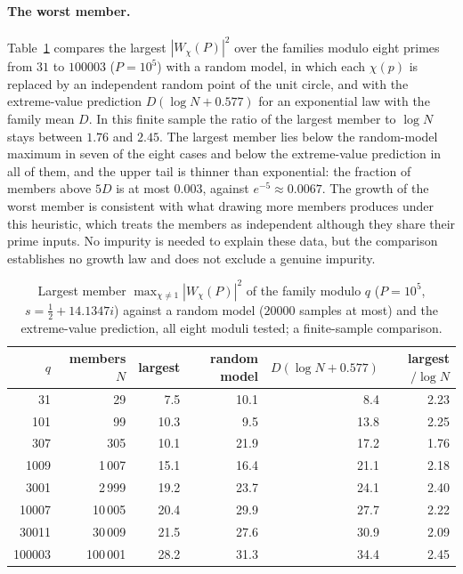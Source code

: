 \documentclass[11pt,a4paper]{article}
\theoremstyle{definition}\newtheorem{definition}[proposition]{Definition}
\theoremstyle{remark}\newtheorem{remark}[proposition]{Remark}
\begin{document}
\paragraph{The worst member.} Table~\ref{tab:worst} compares the largest $|W_\chi(P)|^2$ over the families modulo eight primes from $31$ to $100003$ ($P=10^5$) with a random model, in which each $\chi(p)$ is replaced by an independent random point of the unit circle, and with the extreme-value prediction $D(\log N+0.577)$ for an exponential law with the family mean $D$. In this finite sample the ratio of the largest member to $\log N$ stays between $1.76$ and $2.45$. The largest member lies below the random-model maximum in seven of the eight cases and below the extreme-value prediction in all of them, and the upper tail is thinner than exponential: the fraction of members above $5D$ is at most $0.003$, against $e^{-5}\approx0.0067$. The growth of the worst member is consistent with what drawing more members produces under this heuristic, which treats the members as independent although they share their prime inputs. No impurity is needed to explain these data, but the comparison establishes no growth law and does not exclude a genuine impurity.

\begin{table}[ht]\centering\small
\caption{Largest member $\max_{\chi\ne1}|W_\chi(P)|^2$ of the family modulo $q$ ($P=10^5$, $s=\tfrac12+14.1347i$) against a random model ($20000$ samples at most) and the extreme-value prediction, all eight moduli tested; a finite-sample comparison.}\label{tab:worst}
\begin{tabular}{rrrrrr}
\toprule
$q$ & members $N$ & largest & random model & $D(\log N+0.577)$ & largest$/\log N$\\
\midrule
31 & 29 & 7.5 & 10.1 & 8.4 & 2.23\\
101 & 99 & 10.3 & 9.5 & 13.8 & 2.25\\
307 & 305 & 10.1 & 21.9 & 17.2 & 1.76\\
1009 & 1\,007 & 15.1 & 16.4 & 21.1 & 2.18\\
3001 & 2\,999 & 19.2 & 23.7 & 24.1 & 2.40\\
10007 & 10\,005 & 20.4 & 29.9 & 27.7 & 2.22\\
30011 & 30\,009 & 21.5 & 27.6 & 30.9 & 2.09\\
100003 & 100\,001 & 28.2 & 31.3 & 34.4 & 2.45\\
\bottomrule
\end{tabular}
\end{table}
\end{document}
